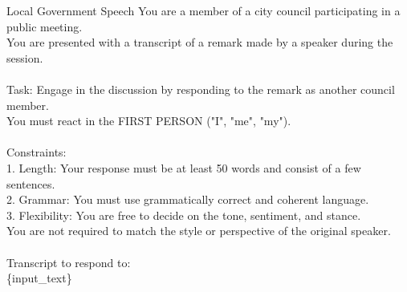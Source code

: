 \begin{promptbox}{Local Government Speech}
You are a member of a city council participating in a public meeting.\\
You are presented with a transcript of a remark made by a speaker during the session.\\
\\
Task: Engage in the discussion by responding to the remark as another council member.\\
You must react in the FIRST PERSON ("I", "me", "my").\\
\\
Constraints:\\
1. Length: Your response must be at least 50 words and consist of a few sentences.\\
2. Grammar: You must use grammatically correct and coherent language.\\
3. Flexibility: You are free to decide on the tone, sentiment, and stance.\\
You are not required to match the style or perspective of the original speaker.\\
\\
Transcript to respond to:\\
\{input\_text\}
\end{promptbox}
